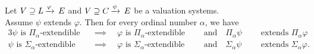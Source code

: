 \documentclass[main.tex]{subfiles}
\begin{document}
%
%
\begin{lem}
\label{L:alpha-monotonous}
Let $V \supseteq L\,\smash{\xrightarrow{\varphi}\,E}$
and $V \supseteq C\,\smash{\xrightarrow{\psi}\,E}$
 be a valuation systems.\\
Assume 
$\psi$ extends $\varphi$.
Then for every ordinal number $\alpha$, we have
\begin{alignat*}{3}
\text{$\psi$ is $\Pi_\alpha$-extendible}
\quad&\implies\quad
\text{$\varphi$ is $\Pi_\alpha$-extendible}
\quad&&\text{and}\quad
\text{$\Pi_\alpha\psi$ }&&\text{extends $\Pi_\alpha\varphi$} \\
\text{$\psi$ is $\Sigma_\alpha$-extendible}
\quad&\implies\quad
\text{$\varphi$ is $\Sigma_\alpha$-extendible}
\quad&&\text{and}\quad
\text{$\Sigma_\alpha\psi$ }&&\text{extends $\Sigma_\alpha\varphi$.}
\end{alignat*}
\end{lem}
\end{document}
